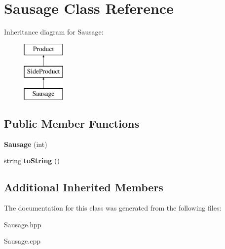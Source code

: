 \hypertarget{class_sausage}{}\section{Sausage Class Reference}
\label{class_sausage}
Inheritance diagram for Sausage\+:\begin{figure}[H]
\begin{center}
\leavevmode
\includegraphics[height=3.000000cm]{class_sausage}
\end{center}
\end{figure}
\subsection*{Public Member Functions}
\begin{DoxyCompactItemize}
\item 
\mbox{\label{class_sausage_ac8ca7d3016fc748234e12839922955fb}} 
{\bfseries Sausage} (int)
\item 
\mbox{\label{class_sausage_abc01737cdaaaf543faf6615d50055ac9}} 
string {\bfseries to\+String} ()
\end{DoxyCompactItemize}
\subsection*{Additional Inherited Members}


The documentation for this class was generated from the following files\+:\begin{DoxyCompactItemize}
\item 
Sausage.\+hpp\item 
Sausage.\+cpp\end{DoxyCompactItemize}
